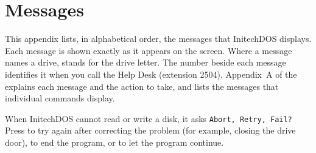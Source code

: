 \chapter{Messages}
This appendix lists, in alphabetical order, the messages that InitechDOS
displays.  Each message is shown exactly as it appears on the screen.  Where
a message names a drive,  stands for the drive letter.  The number
beside each message identifies it when you call the Help Desk (extension
2504).  Appendix~A of the  explains each
message and the action to take, and lists the messages that individual
commands display.

When InitechDOS cannot read or write a disk, it asks
\texttt{Abort, Retry, Fail?}  Press  to try again after correcting
the problem (for example, closing the drive door),  to end the
program, or  to let the program continue.


